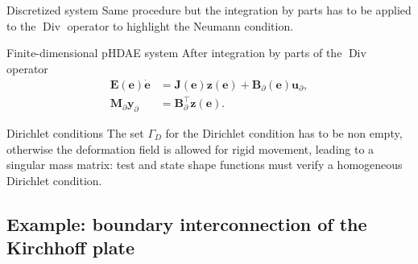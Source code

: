 \documentclass[aspectratio=169]{ISAE-Beamer}
\DeclareMathOperator*{\Div}{Div}
\begin{document}
\begin{frame}{Discretized system}
Same procedure but the integration by parts has to be applied to the $\Div$ operator to highlight the Neumann condition.
\begin{exampleblock}{Finite-dimensional pHDAE system}
	\setlength{\abovedisplayskip}{3pt}
	\setlength{\belowdisplayskip}{3pt}
	After integration by parts of the $\Div$ operator
	\begin{equation*}
	\begin{aligned}
	\mathbf{E}(\mathbf{e}) \dot{\mathbf{e}} &= \mathbf{J}(\mathbf{e}) \mathbf{z}(\mathbf{e}) + \mathbf{B}_\partial(\mathbf{e}) \mathbf{u}_\partial, \\
	\mathbf{M}_\partial \mathbf{y}_\partial &= \mathbf{B}_\partial^\top \mathbf{z}(\mathbf{e}).
	\end{aligned}
	\end{equation*}
\end{exampleblock}

\begin{block}{Dirichlet conditions}
	The set $\Gamma_D$ for the Dirichlet condition has to be non empty, otherwise the deformation field is allowed for rigid movement, leading to a singular mass matrix: test and state shape functions must verify a homogeneous Dirichlet condition. 
\end{block}
\end{frame}

\subsection{Example: boundary interconnection of the Kirchhoff plate}
\end{document}
